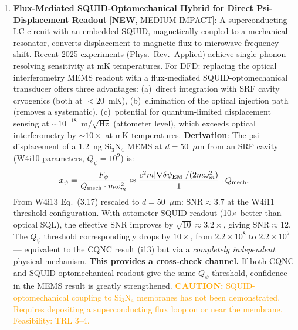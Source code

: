 \documentclass[11pt]{article}
\newcommand{\ee}[1]{\times 10^{#1}}
\newcommand{\Qpsi}{Q_\psi}
\newcommand{\Qmech}{Q_{\rm mech}}
\newcommand{\SNR}{\mathrm{SNR}}
\newcommand{\dpsiEM}{\delta\psi_{\rm EM}}
\newcommand{\caution}[1]{\textcolor{orange}{\textbf{CAUTION:} #1}}
\theoremstyle{definition}
\theoremstyle{remark}
\begin{document}
\begin{tcolorbox}[colback=blue!5!white, colframe=blue!60!black,
  title=\textbf{W4i14 --- P2 PASSIVE DETECTION: TOP 5 FINDINGS}]
\begin{enumerate}[nosep]
\item \textbf{Flux-Mediated SQUID-Optomechanical Hybrid for
  Direct Psi-Displacement Readout} [\textbf{NEW}, MEDIUM IMPACT]:
  A superconducting LC circuit with an embedded SQUID, magnetically
  coupled to a mechanical resonator, converts displacement to
  magnetic flux to microwave frequency shift. Recent 2025 experiments
  (Phys.\ Rev.\ Applied) achieve single-phonon-resolving sensitivity
  at mK temperatures. For DFD: replacing the optical interferometry
  MEMS readout with a flux-mediated SQUID-optomechanical transducer
  offers three advantages:
  (a)~direct integration with SRF cavity cryogenics (both at $<20$~mK),
  (b)~elimination of the optical injection path (removes a systematic),
  (c)~potential for quantum-limited displacement sensing at
  $\sim 10^{-18}$~m/$\sqrt{\text{Hz}}$ (attometer level), which
  exceeds optical interferometry by $\sim 10\times$ at mK temperatures.
  \textbf{Derivation}: The psi-displacement of a 1.2~ng Si$_3$N$_4$
  MEMS at $d = 50$~$\mu$m from an SRF cavity (W4i10 parameters,
  $\Qpsi = 10^9$) is:
  \begin{equation}
  x_\psi = \frac{F_\psi}{\Qmech \cdot m \omega_m^2}
  \approx \frac{c^2 m |\nabla\dpsiEM|/(2 m \omega_m^2)}{1}
  \cdot \Qmech.
  \end{equation}
  From W4i13 Eq.~(3.17) rescaled to $d = 50$~$\mu$m:
  $\SNR \approx 3.7$ at the W4i11 threshold configuration. With
  attometer SQUID readout (10$\times$ better than optical SQL),
  the effective $\SNR$ improves by $\sqrt{10} \approx 3.2\times$,
  giving $\SNR \approx 12$. The $\Qpsi$ threshold correspondingly
  drops by $10\times$, from $2.2\ee{8}$ to $2.2\ee{7}$ ---
  equivalent to the CQNC result (i13) but via a \emph{completely
  independent} physical mechanism.
  \textbf{This provides a cross-check channel.} If both CQNC
  and SQUID-optomechanical readout give the same $\Qpsi$ threshold,
  confidence in the MEMS result is greatly strengthened.
  \caution{SQUID-optomechanical coupling to Si$_3$N$_4$ membranes
  has not been demonstrated. Requires depositing a superconducting
  flux loop on or near the membrane. Feasibility: TRL 3--4.}


\end{enumerate}
\end{tcolorbox}
\end{document}
